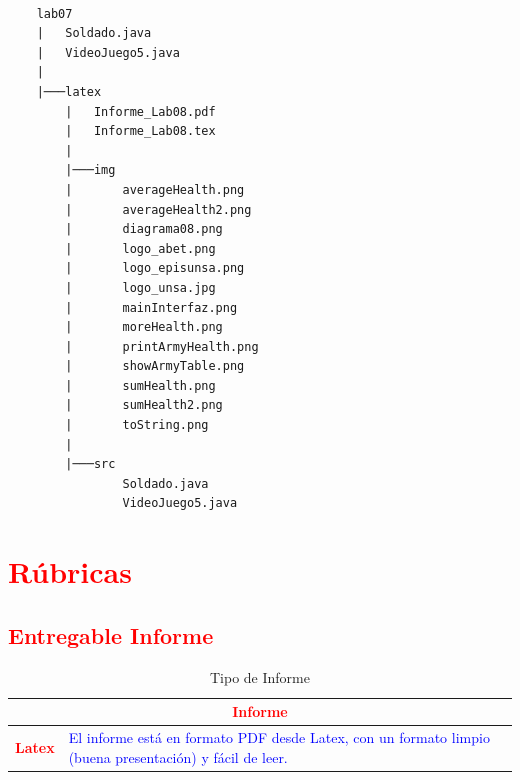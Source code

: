\documentclass{article}
\begin{document}
\begin{lstlisting}[style=ascii-tree]

    lab07
    |   Soldado.java
    |   VideoJuego5.java
    |
    |───latex
        |   Informe_Lab08.pdf
        |   Informe_Lab08.tex
        |
        |───img
        |       averageHealth.png
        |       averageHealth2.png
        |       diagrama08.png
        |       logo_abet.png
        |       logo_episunsa.png
        |       logo_unsa.jpg
        |       mainInterfaz.png
        |       moreHealth.png
        |       printArmyHealth.png
        |       showArmyTable.png
        |       sumHealth.png
        |       sumHealth2.png
        |       toString.png
        |
        |───src
                Soldado.java
                VideoJuego5.java

\end{lstlisting}    

	\section{\textcolor{red}{Rúbricas}}
	
	\subsection{\textcolor{red}{Entregable Informe}}
	\begin{table}[H]
		\caption{Tipo de Informe}
		\setlength{\tabcolsep}{0.5em} %
		{\renewcommand{\arraystretch}{1.5} %
		\begin{tabular}{|p{3cm}|p{12cm}|}
			\hline
			\multicolumn{2}{|c|}{\textbf{\textcolor{red}{Informe}}}  \\
			\hline 
			\textbf{\textcolor{red}{Latex}} & \textcolor{blue}{El informe está en formato PDF desde Latex,  con un formato limpio (buena presentación) y fácil de leer.}   \\ 
			\hline 
			
			
		\end{tabular}
	}
	\end{table}
	
	\clearpage
 
\end{document}
